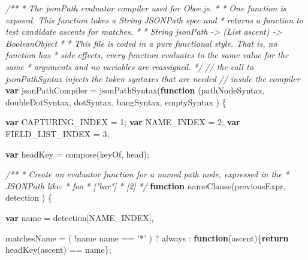 \documentclass[]{article}
\newenvironment{Shaded}{}{}
\newcommand{\KeywordTok}[1]{\textcolor[rgb]{0.00,0.44,0.13}{\textbf{{#1}}}}
\newcommand{\DecValTok}[1]{\textcolor[rgb]{0.25,0.63,0.44}{{#1}}}
\newcommand{\StringTok}[1]{\textcolor[rgb]{0.25,0.44,0.63}{{#1}}}
\newcommand{\CommentTok}[1]{\textcolor[rgb]{0.38,0.63,0.69}{\textit{{#1}}}}
\newcommand{\FunctionTok}[1]{\textcolor[rgb]{0.02,0.16,0.49}{{#1}}}
\newcommand{\NormalTok}[1]{{#1}}
\begin{document}
\begin{Shaded}
\begin{Highlighting}[]
\CommentTok{/**}
\CommentTok{ * The jsonPath evaluator compiler used for Oboe.js. }
\CommentTok{ * }
\CommentTok{ * One function is exposed. This function takes a String JSONPath spec and }
\CommentTok{ * returns a function to test candidate ascents for matches.}
\CommentTok{ * }
\CommentTok{ *  String jsonPath -> (List ascent) -> Boolean\textbar{}Object}
\CommentTok{ *}
\CommentTok{ * This file is coded in a pure functional style. That is, no function has }
\CommentTok{ * side effects, every function evaluates to the same value for the same }
\CommentTok{ * arguments and no variables are reassigned.}
\CommentTok{ */}  
\CommentTok{// the call to jsonPathSyntax injects the token syntaxes that are needed }
\CommentTok{// inside the compiler}
\KeywordTok{var} \NormalTok{jsonPathCompiler = }\FunctionTok{jsonPathSyntax}\NormalTok{(}\KeywordTok{function} \NormalTok{(pathNodeSyntax, }
                                                \NormalTok{doubleDotSyntax, }
                                                \NormalTok{dotSyntax,}
                                                \NormalTok{bangSyntax,}
                                                \NormalTok{emptySyntax ) \{}

   \KeywordTok{var} \NormalTok{CAPTURING_INDEX = }\DecValTok{1}\NormalTok{;}
   \KeywordTok{var} \NormalTok{NAME_INDEX = }\DecValTok{2}\NormalTok{;}
   \KeywordTok{var} \NormalTok{FIELD_LIST_INDEX = }\DecValTok{3}\NormalTok{;}

   \KeywordTok{var} \NormalTok{headKey = }\FunctionTok{compose}\NormalTok{(keyOf, head);}
                   
   \CommentTok{/**}
\CommentTok{    * Create an evaluator function for a named path node, expressed in the}
\CommentTok{    * JSONPath like:}
\CommentTok{    *    foo}
\CommentTok{    *    ["bar"]}
\CommentTok{    *    [2]   }
\CommentTok{    */}
   \KeywordTok{function} \FunctionTok{nameClause}\NormalTok{(previousExpr, detection ) \{}
     
      \KeywordTok{var} \NormalTok{name = detection[NAME_INDEX],}
            
          \NormalTok{matchesName = ( !name \textbar{}\textbar{} name == }\StringTok{'*'} \NormalTok{) }
                           \NormalTok{?  always}
                           \NormalTok{:  }\KeywordTok{function}\NormalTok{(ascent)\{}\KeywordTok{return} \FunctionTok{headKey}\NormalTok{(ascent) == name\};}
     


\end{Highlighting}
\end{Shaded}
\end{document}
